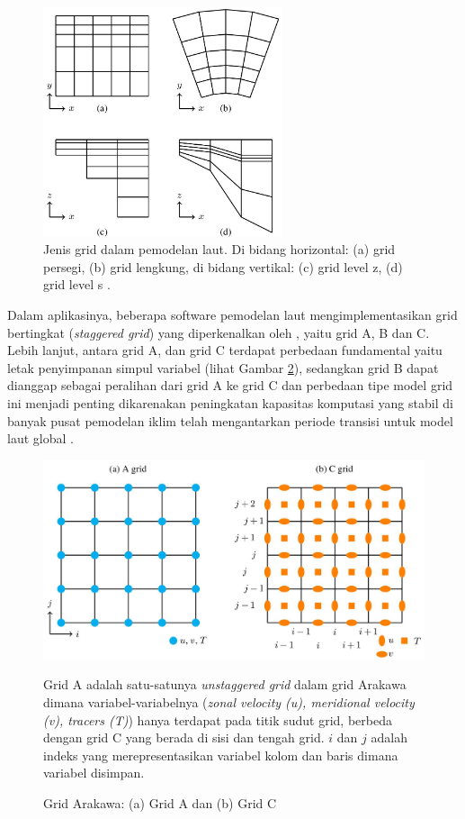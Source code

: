 \begin{spacing}{1.5}
	\begin{figure}[H]
		\centering
		\includegraphics[width=7cm]{contents/grid.jpg}
		\caption{Jenis grid dalam pemodelan laut. Di bidang horizontal: (a) grid persegi, (b) grid lengkung, di bidang vertikal: (c) grid level z, (d) grid level s \protect{}.}
		\label{fig:grid}
	\end{figure}
	
	Dalam aplikasinya, beberapa software pemodelan laut mengimplementasikan grid bertingkat (\textit{staggered grid}) yang diperkenalkan oleh , yaitu grid A, B dan C. Lebih lanjut, antara grid A, dan grid C terdapat perbedaan fundamental yaitu letak penyimpanan simpul variabel (lihat Gambar \ref{fig:arakawa}), sedangkan grid B dapat dianggap sebagai peralihan dari grid A ke grid C dan perbedaan tipe model grid ini menjadi penting dikarenakan peningkatan kapasitas komputasi yang stabil di banyak pusat pemodelan iklim telah mengantarkan periode transisi untuk model laut global  . 
	
	\begin{figure}[H]
		\centering
		\includegraphics[width=13cm]{contents/arakawa.jpg}
		\caption{Grid Arakawa: (a) Grid A dan (b) Grid C \protect{}}
		\label{fig:arakawa}
		\medspace
		\small
		Grid A adalah satu-satunya \textit{unstaggered grid} dalam grid Arakawa dimana variabel-variabelnya (\textit{zonal velocity (u), meridional velocity (v), tracers (T)}) hanya terdapat pada titik sudut grid, berbeda dengan grid C yang berada di sisi dan tengah grid. $i$ dan $j$ adalah indeks yang merepresentasikan variabel kolom dan baris dimana variabel disimpan.
	\end{figure}
\end{spacing}
\vspace{-0.1pc}
